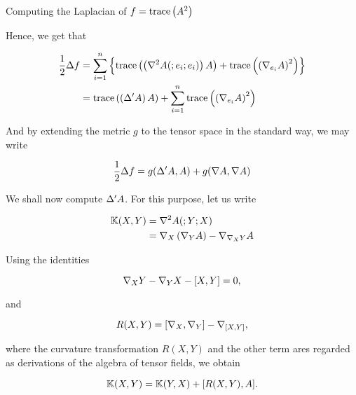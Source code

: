 \begin{frame}[allowframebreaks]{Computing the Laplacian of \(f=\text{trace}\left({A^{2}}\right)\)}
  \framebreak

  Hence, we get that

  \begin{align*}
    \frac{1}{2}\Delta{f} & = \sum_{i=1}^{n}\left\{\text{trace}\left({\left(\nabla^{2}A(;e_{i};e_{i})\right)A}\right)+\text{trace}\left({\left(\nabla_{e_{i}}A\right)^{2}}\right)\right\} \\
                             & = \text{trace}\left({\left(\Delta'{A}\right)A}\right)+\sum_{i=1}^{n}\text{trace}\left({\left(\nabla_{e_{i}}A\right)^{2}}\right)                          \\
  \end{align*}

  \framebreak

  And by extending the metric \(g\) to the tensor space in the standard way, we
  may write

  \begin{equation}\label{eq:laplacian-of-f-in-terms-of-the-restricted-laplacian-of-A}
    \frac{1}{2}\Delta{f}=g(\Delta'{A},A)+g(\nabla{A},\nabla{A})
  \end{equation}

  \framebreak

  We shall now compute \(\Delta'{A}\). For this purpose, let us write

  \begin{align*}
    \mathbb{K}(X,Y) & =\nabla^{2}A(;Y;X)                                                                \\
                                                  & =\nabla_{X}\left(\nabla_{Y}A\right)-\nabla_{\nabla_{X}Y}A
  \end{align*}

  \framebreak

  Using the identities

  \[
    \nabla_{X}Y-\nabla_{Y}X-[X,Y]=0,
  \]

  and

  \[
    R(X,Y)=[\nabla_{X},\nabla_{Y}]-\nabla_{[X,Y]},
  \]

  where the curvature transformation \(R(X,Y)\) and the other term ares
  regarded as derivations of the algebra of tensor fields, we obtain

  \begin{equation}\label{eq:symmetry-of-the-second-covariant-derivative-of-the-shape-operator}
    \mathbb{K}(X,Y)=\mathbb{K}(Y,X)+[R(X,Y),A].
  \end{equation}


\end{frame}

